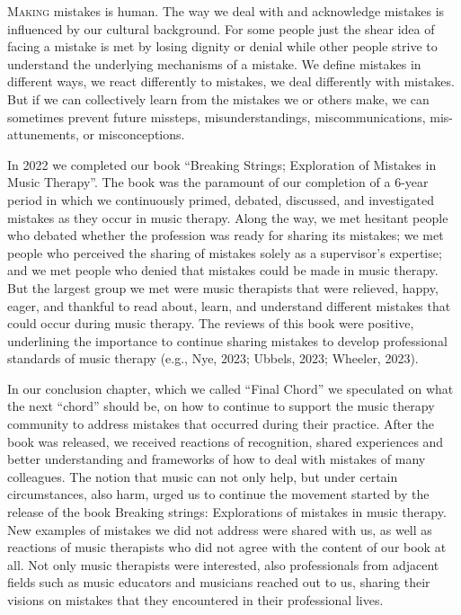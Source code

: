 \documentclass[authordate, empirical, issue]{jote-new-article}
\author[1]{\mbox{Laurien Hakvoort}}
\affil[1]{ArtEZ University of the Arts}
\author[2]{\mbox{Avi Gilboa}}
\affil[2]{Bar Ilan University}
\begin{document}
\begin{frontmatter}
  \maketitle
  \begin{abstract}
    \printabstracttext
  \end{abstract}
\end{frontmatter}






\lettrine{M}{aking} mistakes is human. The way we deal with and acknowledge mistakes is influenced by our cultural background. For some people just the shear idea of facing a mistake is met by losing dignity or denial while other people strive to understand the underlying mechanisms of a mistake. We define mistakes in different ways, we react differently to mistakes, we deal differently with mistakes. But if we can collectively learn from the mistakes we or others make, we can sometimes prevent future missteps, misunderstandings, miscommunications, mis-attunements, or misconceptions.



In 2022 we completed our book “Breaking Strings; Exploration of Mistakes in Music Therapy”. The book was the paramount of our completion of a 6-year period in which we continuously primed, debated, discussed, and investigated mistakes as they occur in music therapy. Along the way, we met hesitant people who debated whether the profession was ready for sharing its mistakes; we met people who perceived the sharing of mistakes solely as a supervisor's expertise; and we met people who denied that mistakes could be made in music therapy. But the largest group we met were music therapists that were relieved, happy, eager, and thankful to read about, learn, and understand different mistakes that could occur during music therapy. The reviews of this book were positive, underlining the importance to continue sharing mistakes to develop professional standards of music therapy (e.g., Nye, 2023; Ubbels, 2023; Wheeler, 2023).



In our conclusion chapter, which we called “Final Chord” we speculated on what the next “chord” should be, on how to continue to support the music therapy community to address mistakes that occurred during their practice. After the book was released, we received reactions of recognition, shared experiences and better understanding and frameworks of how to deal with mistakes of many colleagues. The notion that music can not only help, but under certain circumstances, also harm, urged us to continue the movement started by the release of the book Breaking strings: Explorations of mistakes in music therapy. New examples of mistakes we did not address were shared with us, as well as reactions of music therapists who did not agree with the content of our book at all. Not only music therapists were interested, also professionals from adjacent fields such as music educators and musicians reached out to us, sharing their visions on mistakes that they encountered in their professional lives.
\end{document}
